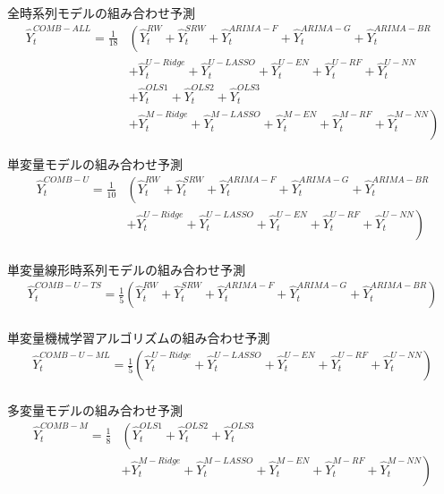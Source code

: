 \documentclass[a4paper，11pt]{jsarticle}
\begin{document}
全時系列モデルの組み合わせ予測
\begin{equation}
\begin{split}
  \hat{Y}_t^{COMB-ALL} = \frac{1}{18} & \left( \hat{Y}_t^{RW} + \hat{Y}_t^{SRW} + \hat{Y}_t^{ARIMA-F} + \hat{Y}_t^{ARIMA-G} + \hat{Y}_t^{ARIMA-BR} \right. \\
  &+ \hat{Y}_t^{U-Ridge} + \hat{Y}_t^{U-LASSO} + \hat{Y}_t^{U-EN} + \hat{Y}_t^{U-RF} + \hat{Y}_t^{U-NN} \\
  &+ \hat{Y}_t^{OLS1} + \hat{Y}_t^{OLS2} + \hat{Y}_t^{OLS3} \\
  &\left. + \hat{Y}_t^{M-Ridge} + \hat{Y}_t^{M-LASSO} + \hat{Y}_t^{M-EN} + \hat{Y}_t^{M-RF} + \hat{Y}_t^{M-NN} \right)
\end{split}
\end{equation}

単変量モデルの組み合わせ予測
\begin{equation}
\begin{split}
\hat{Y}_t^{COMB-U} = \frac{1}{10} & \left( \hat{Y}_t^{RW} + \hat{Y}_t^{SRW} + \hat{Y}_t^{ARIMA-F} + \hat{Y}_t^{ARIMA-G} + \hat{Y}_t^{ARIMA-BR} \right. \\
&\left. + \hat{Y}_t^{U-Ridge} + \hat{Y}_t^{U-LASSO} + \hat{Y}_t^{U-EN} + \hat{Y}_t^{U-RF} + \hat{Y}_t^{U-NN} \right) \\
\end{split}
\end{equation}

単変量線形時系列モデルの組み合わせ予測
\begin{equation}
\begin{split}  
\hat{Y}_t^{COMB-U-TS} = \frac{1}{5} \left( \hat{Y}_t^{RW} + \hat{Y}_t^{SRW} + \hat{Y}_t^{ARIMA-F} + \hat{Y}_t^{ARIMA-G} + \hat{Y}_t^{ARIMA-BR} \right) \\
\end{split}
\end{equation}

単変量機械学習アルゴリズムの組み合わせ予測
\begin{equation}
\begin{split}  
\hat{Y}_t^{COMB-U-ML} = \frac{1}{5} \left( \hat{Y}_t^{U-Ridge} + \hat{Y}_t^{U-LASSO} + \hat{Y}_t^{U-EN} + \hat{Y}_t^{U-RF} + \hat{Y}_t^{U-NN} \right) \\
\end{split}
\end{equation}

多変量モデルの組み合わせ予測
\begin{equation}
\begin{split}  
\hat{Y}_t^{COMB-M} = \frac{1}{8} & \left( \hat{Y}_t^{OLS1} + \hat{Y}_t^{OLS2} + \hat{Y}_t^{OLS3} \right.\\
&\left. + \hat{Y}_t^{M-Ridge} + \hat{Y}_t^{M-LASSO} + \hat{Y}_t^{M-EN} + \hat{Y}_t^{M-RF} + \hat{Y}_t^{M-NN} \right) \\
\end{split}
\end{equation}
\end{document}
